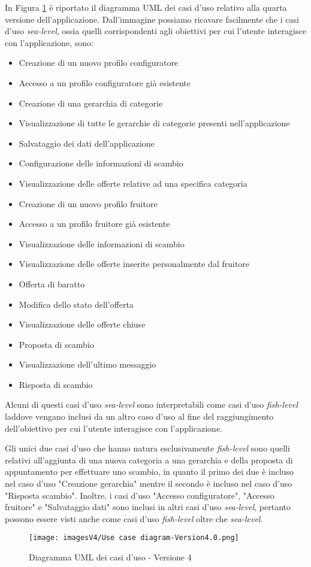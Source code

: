 In Figura \ref{fig:Use Case 4} è riportato il diagramma UML dei casi d'uso relativo alla quarta versione dell'applicazione. Dall'immagine possiamo ricavare facilmente che i casi d'uso \textit{sea-level}, ossia quelli corrispondenti agli obiettivi per cui l'utente interagisce con l'applicazione, sono:
\begin{itemize}
    \item Creazione di un nuovo profilo configuratore 
    \item Accesso a un profilo configuratore già esistente
    \item Creazione di una gerarchia di categorie
    \item Visualizzazione di tutte le gerarchie di categorie presenti nell'applicazione
    \item Salvataggio dei dati dell'applicazione
    \item Configurazione delle informazioni di scambio
    \item Visualizzazione delle offerte relative ad una specifica categoria
    \item Creazione di un nuovo profilo fruitore
    \item Accesso a un profilo fruitore già esistente
    \item Visualizzazione delle informazioni di scambio
    \item Visualizzazione delle offerte inserite personalmente dal fruitore
    \item Offerta di baratto
    \item Modifica dello stato dell'offerta  
    \item Visualizzazione delle offerte chiuse
    \item Proposta di scambio
    \item Visualizzazione dell'ultimo messaggio
    \item Risposta di scambio
\end{itemize}
Alcuni di questi casi d'uso \textit{sea-level} sono interpretabili come casi d'uso \textit{fish-level} laddove vengano inclusi da un altro caso d'uso al fine del raggiungimento dell'obiettivo per cui l'utente interagisce con l'applicazione.

Gli unici due casi d'uso che hanno natura esclusivamente \textit{fish-level} sono quelli relativi all'aggiunta di una nuova categoria a una gerarchia e della proposta di appuntamento per effettuare uno scambio, in quanto il primo dei due è incluso nel caso d'uso "Creazione gerarchia" mentre il secondo è incluso nel caso d'uso "Risposta scambio". Inoltre, i casi d'uso "Accesso configuratore", "Accesso fruitore" e "Salvataggio dati" sono inclusi in altri casi d'uso \textit{sea-level}, pertanto possono essere visti anche come casi d'uso \textit{fish-level} oltre che \textit{sea-level}.

\begin{figure}[ht]
\centering
\texttt{[image: imagesV4/Use case diagram-Version4.0.png]}
\caption{\label{fig:Use Case 4}Diagramma UML dei casi d'uso - Versione 4}
\end{figure}\bigskip

